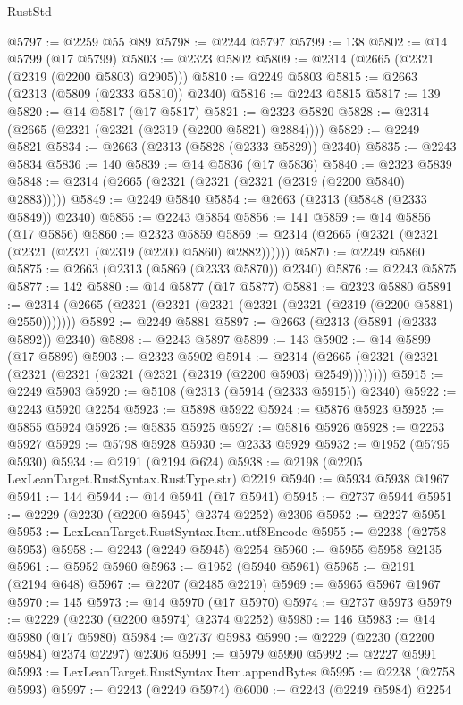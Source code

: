 \begin{lexlean}{RustStd}
\begin{coremodule}
@5797 := @2259 @55 @89
@5798 := @2244 @5797
@5799 := 138
@5802 := @14 @5799 (@17 @5799)
@5803 := @2323 @5802
@5809 := @2314 (@2665 (@2321 (@2319 (@2200 @5803) @2905)))
@5810 := @2249 @5803
@5815 := @2663 (@2313 (@5809 (@2333 @5810)) @2340)
@5816 := @2243 @5815
@5817 := 139
@5820 := @14 @5817 (@17 @5817)
@5821 := @2323 @5820
@5828 := @2314 (@2665 (@2321 (@2321 (@2319 (@2200 @5821) @2884))))
@5829 := @2249 @5821
@5834 := @2663 (@2313 (@5828 (@2333 @5829)) @2340)
@5835 := @2243 @5834
@5836 := 140
@5839 := @14 @5836 (@17 @5836)
@5840 := @2323 @5839
@5848 := @2314 (@2665 (@2321 (@2321 (@2321 (@2319 (@2200 @5840) @2883)))))
@5849 := @2249 @5840
@5854 := @2663 (@2313 (@5848 (@2333 @5849)) @2340)
@5855 := @2243 @5854
@5856 := 141
@5859 := @14 @5856 (@17 @5856)
@5860 := @2323 @5859
@5869 := @2314 (@2665 (@2321 (@2321 (@2321 (@2321 (@2319 (@2200 @5860) @2882))))))
@5870 := @2249 @5860
@5875 := @2663 (@2313 (@5869 (@2333 @5870)) @2340)
@5876 := @2243 @5875
@5877 := 142
@5880 := @14 @5877 (@17 @5877)
@5881 := @2323 @5880
@5891 := @2314 (@2665 (@2321 (@2321 (@2321 (@2321 (@2321 (@2319 (@2200 @5881) @2550)))))))
@5892 := @2249 @5881
@5897 := @2663 (@2313 (@5891 (@2333 @5892)) @2340)
@5898 := @2243 @5897
@5899 := 143
@5902 := @14 @5899 (@17 @5899)
@5903 := @2323 @5902
@5914 := @2314 (@2665 (@2321 (@2321 (@2321 (@2321 (@2321 (@2321 (@2319 (@2200 @5903) @2549))))))))
@5915 := @2249 @5903
@5920 := @5108 (@2313 (@5914 (@2333 @5915)) @2340)
@5922 := @2243 @5920 @2254
@5923 := @5898 @5922
@5924 := @5876 @5923
@5925 := @5855 @5924
@5926 := @5835 @5925
@5927 := @5816 @5926
@5928 := @2253 @5927
@5929 := @5798 @5928
@5930 := @2333 @5929
@5932 := @1952 (@5795 @5930)
@5934 := @2191 (@2194 @624)
@5938 := @2198 (@2205 LexLeanTarget.RustSyntax.RustType.str) @2219
@5940 := @5934 @5938 @1967
@5941 := 144
@5944 := @14 @5941 (@17 @5941)
@5945 := @2737 @5944
@5951 := @2229 (@2230 (@2200 @5945) @2374 @2252) @2306
@5952 := @2227 @5951
@5953 := LexLeanTarget.RustSyntax.Item.utf8Encode
@5955 := @2238 (@2758 @5953)
@5958 := @2243 (@2249 @5945) @2254
@5960 := @5955 @5958 @2135
@5961 := @5952 @5960
@5963 := @1952 (@5940 @5961)
@5965 := @2191 (@2194 @648)
@5967 := @2207 (@2485 @2219)
@5969 := @5965 @5967 @1967
@5970 := 145
@5973 := @14 @5970 (@17 @5970)
@5974 := @2737 @5973
@5979 := @2229 (@2230 (@2200 @5974) @2374 @2252)
@5980 := 146
@5983 := @14 @5980 (@17 @5980)
@5984 := @2737 @5983
@5990 := @2229 (@2230 (@2200 @5984) @2374 @2297) @2306
@5991 := @5979 @5990
@5992 := @2227 @5991
@5993 := LexLeanTarget.RustSyntax.Item.appendBytes
@5995 := @2238 (@2758 @5993)
@5997 := @2243 (@2249 @5974)
@6000 := @2243 (@2249 @5984) @2254

\end{coremodule}
\end{lexlean}
